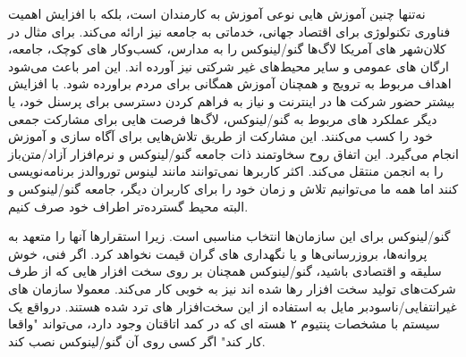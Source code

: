 نه‌تنها چنین آموزش هایی نوعی آموزش به کارمندان است، بلکه با افزایش
اهمیت فناوری تکنولوژی برای اقتصاد جهانی، خدماتی به جامعه نیز ارائه می‌کند.
برای مثال در کلان‌شهر های آمریکا لاگ‌ها گنو/لینوکس را به مدارس، کسب‌و‌کار های کوچک،
جامعه،  ارگان های عمومی و سایر محیط‌های غیر شرکتی نیز آورده اند.
این امر باعث می‌شود اهداف مربوط به ترویج و همچنان آموزش همگانی برای مردم براورده شود.
با افزایش بیشتر حضور شرکت ها در اینترنت و نیاز به فراهم کردن دسترسی برای پرسنل خود،
یا دیگر عملکرد های مربوط به گنو/لینوکس، لاگ‌ها فرصت هایی برای مشارکت جمعی خود را کسب می‌کنند.
این مشارکت از طریق تلاش‌هایی برای آگاه سازی و آموزش انجام می‌گیرد.
این اتفاق روح سخاوتمند ذات جامعه گنو/لینوکس و نرم‌افزار‌ آزاد/متن‌باز را به انجمن منتقل می‌کند.
اکثر کاربرها نمی‌توانند مانند لینوس توروالدز برنامه‌نویسی کنند اما همه ما می‌توانیم تلاش و زمان خود را
برای کاربران دیگر، جامعه گنو/لینوکس و البته محیط گسترده‌تر اطراف خود صرف کنیم.

گنو/لینوکس برای این سازمان‌ها انتخاب مناسبی است. زیرا استقرارها
آنها را متعهد به پروانه‌ها، بروزرسانی‌ها و یا نگهداری های گران قیمت
نخواهد کرد. اگر فنی، خوش سلیقه و اقتصادی باشید، گنو/لینوکس همچنان بر روی
سخت افزار هایی که از طرف شرکت‌های تولید سخت افزار رها شده اند نیز به خوبی
کار می‌کند. معمولا سازمان های غیرانتفایی/ناسودبر مایل به استفاده از این
سخت‌افزار های ترد شده هستند. درواقع یک سیستم با مشخصات پنتیوم ۲ هسته ای
که در کمد اتاقتان وجود دارد، می‌تواند "واقعا کار کند" اگر کسی روی آن
گنو/لینوکس نصب کند.


